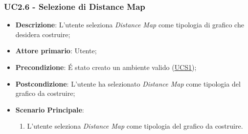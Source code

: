 \subsubsection{UC2.6 - Selezione di Distance Map}
\label{ssub:uc2.6}
\begin{itemize}
	\item \textbf{Descrizione}: L’utente seleziona \emph{Distance Map} come tipologia di grafico che desidera 
	costruire;
	\item \textbf{Attore primario}:	Utente;
	\item \textbf{Precondizione}:	É stato creato un ambiente valido (\hyperref[sub:uc1]{UCS1});

    \item \textbf{Postcondizione}:  L'utente ha selezionato \emph{Distance Map} come tipologia del grafico da 
	costruire;

	\item \textbf{Scenario Principale}: 
	\begin{enumerate}
		\item L'utente seleziona \emph{Distance Map} come tipologia del grafico da costruire.
	\end{enumerate}
\end{itemize}
